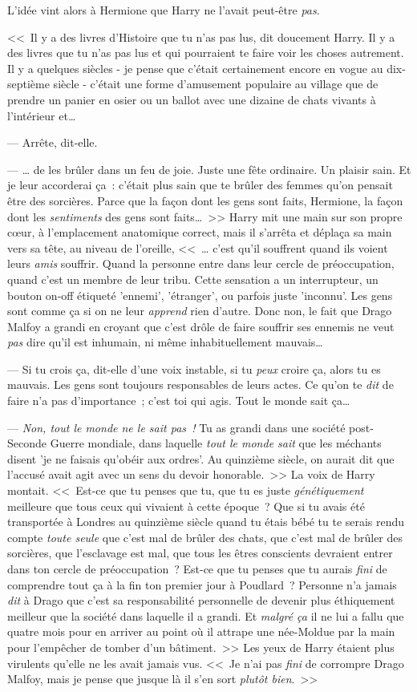 L'idée vint alors à Hermione que Harry ne l'avait peut-être \emph{pas}.

<<~Il y a des livres d'Histoire que tu n'as pas lus, dit doucement Harry. Il y a des livres que tu n'as pas lus et qui pourraient te faire voir les choses autrement. Il y a quelques siècles - je pense que c'était certainement encore en vogue au dix-septième siècle - c'était une forme d'amusement populaire au village que de prendre un panier en osier ou un ballot avec une dizaine de chats vivants à l'intérieur et…

--- Arrête, dit-elle.

--- … de les brûler dans un feu de joie. Juste une fête ordinaire. Un plaisir sain. Et je leur accorderai ça~: c'était plus sain que te brûler des femmes qu'on pensait être des sorcières. Parce que la façon dont les gens sont faits, Hermione, la façon dont les \emph{sentiments} des gens sont faits…~>> Harry mit une main sur son propre cœur, à l'emplacement anatomique correct, mais il s'arrêta et déplaça sa main vers sa tête, au niveau de l'oreille, <<~… c'est qu'il souffrent quand ils voient leurs \emph{amis} souffrir. Quand la personne entre dans leur cercle de préoccupation, quand c'est un membre de leur tribu. Cette sensation a un interrupteur, un bouton on-off étiqueté 'ennemi', 'étranger', ou parfois juste 'inconnu'. Les gens sont comme ça si on ne leur \emph{apprend} rien d'autre. Donc non, le fait que Drago Malfoy a grandi en croyant que c'est drôle de faire souffrir ses ennemis ne veut \emph{pas} dire qu'il est inhumain, ni même inhabituellement mauvais…

--- Si tu crois ça, dit-elle d'une voix instable, si tu \emph{peux} croire ça, alors tu es mauvais. Les gens sont toujours responsables de leurs actes. Ce qu'on te \emph{dit} de faire n'a pas d'importance~; c'est toi qui agis. Tout le monde sait ça…

--- \emph{Non, tout le monde ne le sait pas~!} Tu as grandi dans une société post-Seconde Guerre mondiale, dans laquelle \emph{tout le monde sait} que les méchants disent 'je ne faisais qu'obéir aux ordres'. Au quinzième siècle, on aurait dit que l'accusé avait agit avec un sens du devoir honorable.~>> La voix de Harry montait. <<~Est-ce que tu penses que tu, que tu es juste \emph{génétiquement} meilleure que tous ceux qui vivaient à cette époque~? Que si tu avais été transportée à Londres au quinzième siècle quand tu étais bébé tu te serais rendu compte \emph{toute seule} que c'est mal de brûler des chats, que c'est mal de brûler des sorcières, que l'esclavage est mal, que tous les êtres conscients devraient entrer dans ton cercle de préoccupation~? Est-ce que tu penses que tu aurais \emph{fini} de comprendre tout ça à la fin ton premier jour à Poudlard~? Personne n'a jamais \emph{dit} à Drago que c'est sa responsabilité personnelle de devenir plus éthiquement meilleur que la société dans laquelle il a grandi. Et \emph{malgré ça} il ne lui a fallu que quatre mois pour en arriver au point où il attrape une née-Moldue par la main pour l'empêcher de tomber d'un bâtiment.~>> Les yeux de Harry étaient plus virulents qu'elle ne les avait jamais vus. <<~Je n'ai pas \emph{fini} de corrompre Drago Malfoy, mais je pense que jusque là il s'en sort \emph{plutôt bien}.~>>


